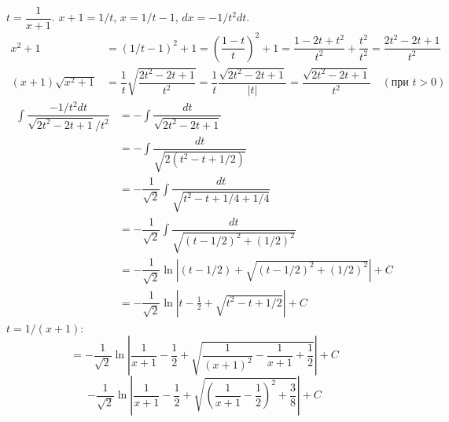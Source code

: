\documentclass{report}
\begin{document}
\sol
{} $t = \dfrac{1}{x+1}$.  $x+1 = 1/t$, $x = 1/t - 1$, $dx = -1/t^2 dt$.
\begin{align*}
x^2+1 &= (1/t - 1)^2 + 1 = \left(\dfrac{1-t}{t}\right)^2 + 1 = \dfrac{1-2t+t^2}{t^2} + \dfrac{t^2}{t^2} = \dfrac{2t^2-2t+1}{t^2} \\
(x+1)\sqrt{x^2+1} &= \dfrac{1}{t} \sqrt{\dfrac{2t^2-2t+1}{t^2}} = \dfrac{1}{t} \dfrac{\sqrt{2t^2-2t+1}}{|t|} = \dfrac{\sqrt{2t^2-2t+1}}{t^2} \quad (\text{при } t>0)
\end{align*}
\begin{align*}
\int \dfrac{-1/t^2 dt}{\sqrt{2t^2-2t+1}/t^2} &= - \int \dfrac{dt}{\sqrt{2t^2-2t+1}} \\
&= - \int \dfrac{dt}{\sqrt{2(t^2-t+1/2)}} \\
&= - \dfrac{1}{\sqrt{2}} \int \dfrac{dt}{\sqrt{t^2-t+1/4+1/4}} \\
&= - \dfrac{1}{\sqrt{2}} \int \dfrac{dt}{\sqrt{(t-1/2)^2 + (1/2)^2}} \\
&= - \dfrac{1}{\sqrt{2}} \ln \left| (t-1/2) + \sqrt{(t-1/2)^2 + (1/2)^2} \right| + C \\
&= - \dfrac{1}{\sqrt{2}} \ln \left| t-\frac{1}{2} + \sqrt{t^2-t+1/2} \right| + C
\end{align*}
 $t = 1/(x+1)$:
\[
= - \dfrac{1}{\sqrt{2}} \ln \left| \frac{1}{x+1}-\frac{1}{2} + \sqrt{\frac{1}{(x+1)^2}-\frac{1}{x+1}+\frac{1}{2}} \right| + C
\]
\[
-\dfrac{1}{\sqrt{2}} \ln \left| \dfrac{1}{x+1} - \dfrac{1}{2} + \sqrt{\left(\dfrac{1}{x+1}-\dfrac{1}{2}\right)^2 + \dfrac{3}{8}} \right| + C
\]
\end{document}
